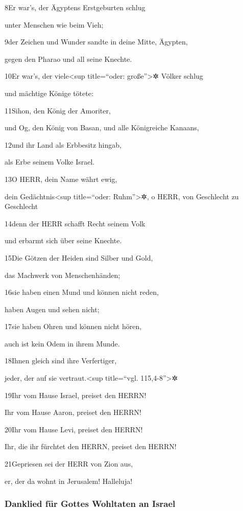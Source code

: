 8Er war's, der Ägyptens Erstgeburten schlug

unter Menschen wie beim Vieh;

9der Zeichen und Wunder sandte in deine Mitte, Ägypten,

gegen den Pharao und all seine Knechte.

10Er war's, der viele\textless sup title=``oder: große''\textgreater✲
Völker schlug

und mächtige Könige tötete:

11Sihon, den König der Amoriter,

und Og, den König von Basan, und alle Königreiche Kanaans,

12und ihr Land als Erbbesitz hingab,

als Erbe seinem Volke Israel.

13O HERR, dein Name währt ewig,

dein Gedächtnis\textless sup title=``oder: Ruhm''\textgreater✲, o HERR,
von Geschlecht zu Geschlecht

14denn der HERR schafft Recht seinem Volk

und erbarmt sich über seine Knechte.

15Die Götzen der Heiden sind Silber und Gold,

das Machwerk von Menschenhänden;

16sie haben einen Mund und können nicht reden,

haben Augen und sehen nicht;

17sie haben Ohren und können nicht hören,

auch ist kein Odem in ihrem Munde.

18Ihnen gleich sind ihre Verfertiger,

jeder, der auf sie vertraut.\textless sup title=``vgl.
115,4-8''\textgreater✲

19Ihr vom Hause Israel, preiset den HERRN!

Ihr vom Hause Aaron, preiset den HERRN!

20Ihr vom Hause Levi, preiset den HERRN!

Ihr, die ihr fürchtet den HERRN, preiset den HERRN!

21Gepriesen sei der HERR von Zion aus,

er, der da wohnt in Jerusalem! Halleluja!

\hypertarget{danklied-fuxfcr-gottes-wohltaten-an-israel}{%
\subsubsection{Danklied für Gottes Wohltaten an
Israel}\label{danklied-fuxfcr-gottes-wohltaten-an-israel}}

